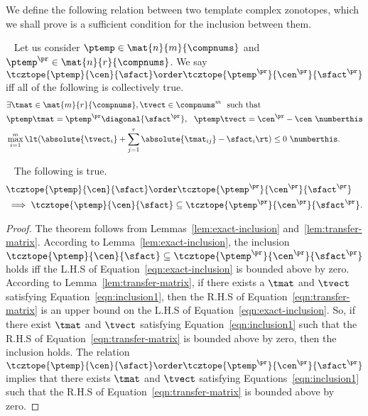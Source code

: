 %
We define the following relation between two template
complex zonotopes, which we shall prove is a sufficient condition for
the inclusion between them.
%
\begin{definition}~\label{defn:inclusion-tcz}
Let us consider $\ptemp\in\mat{n}{m}{\compnums}$ and
$\ptemp^\pr\in\mat{n}{r}{\compnums}$.  We say
$\tcztope{\ptemp}{\cen}{\sfact}\order\tcztope{\ptemp^\pr}{\cen^\pr}{\sfact^\pr}$
iff all of the following is collectively true.
%
\begin{align*}
& \exists \tmat\in\mat{m}{r}{\compnums},\tvect\in\compnums^m~~\text{such
that}\\
& \ptemp\tmat=\ptemp^\pr\diagonal{\sfact^\pr},~~\ptemp\tvect=\cen^\pr-\cen~\numberthis\label{eqn:inclusion-tcz1}\\
& \max_{i=1}^m\lt(\absolute{\tvect_i}+\sum_{j=1}^r\absolute{\tmat_{ij}}-\sfact_i\rt)\leq
0~\numberthis\label{eqn:inclusion-tcz2}.
\end{align*}
%
\end{definition}
%
\begin{theorem}~\label{thm:suff-inclusion}
  The following is true.
%
\begin{align*}
&  \tcztope{\ptemp}{\cen}{\sfact}\order\tcztope{\ptemp^\pr}{\cen^\pr}{\sfact^\pr}\\
&\implies \tcztope{\ptemp}{\cen}{\sfact}\subseteq\tcztope{\ptemp^\pr}{\cen^\pr}{\sfact^\pr}.
\end{align*}
%
\end{theorem}
%
\begin{proof}
The theorem follows from Lemmas~\ref{lem:exact-inclusion}
and~\ref{lem:transfer-matrix}.  According to
Lemma~\ref{lem:exact-inclusion}, the inclusion
$\tcztope{\ptemp}{\cen}{\sfact}\subseteq\tcztope{\ptemp^\pr}{\cen^\pr}{\sfact^\pr}$
holds iff the L.H.S of Equation~\ref{eqn:exact-inclusion} is bounded
above by zero.  According to Lemma~\ref{lem:transfer-matrix}, if there
exists a $\tmat$ and $\tvect$ satisfying
Equation~\ref{eqn:inclusion1}, then the R.H.S of
Equation~\ref{eqn:transfer-matrix} is an upper bound on the L.H.S of
Equation~\ref{eqn:exact-inclusion}.  So, if there exist $\tmat$ and
$\tvect$ satisfying Equation~\ref{eqn:inclusion1} such that the R.H.S
of Equation~\ref{eqn:transfer-matrix} is bounded above by zero, then
the inclusion holds.  The relation
$\tcztope{\ptemp}{\cen}{\sfact}\order\tcztope{\ptemp^\pr}{\cen^\pr}{\sfact^\pr}$
implies that there exists $\tmat$ and $\tvect$ satisfying
Equations~\ref{eqn:inclusion1} such that the R.H.S of
Equation~\ref{eqn:transfer-matrix} is bounded above by zero.
\end{proof}
